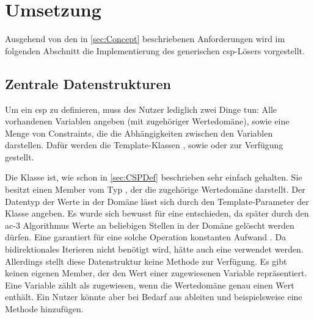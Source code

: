 \section{Umsetzung}
Ausgehend von den in \cref{sec:Concept} beschriebenen Anforderungen wird im folgenden Abschnitt die Implementierung des generischen \ac*{csp}-Lösers vorgestellt.

\subsection{Zentrale Datenstrukturen}
Um ein \ac*{csp} zu definieren, muss des Nutzer lediglich zwei Dinge tun: Alle vorhandenen Variablen angeben (mit zugehöriger Wertedomäne), sowie eine Menge von Constraints, die
die Abhängigkeiten zwischen den Variablen darstellen. Dafür werden die Template-Klassen , sowie  oder  zur
Verfügung gestellt.

Die Klasse  ist, wie schon in \cref{sec:CSPDef} beschrieben sehr einfach gehalten. Sie besitzt einen Member vom Typ , der die zugehörige
Wertedomäne darstellt. Der Datentyp der Werte in der Domäne lässt sich durch den Template-Parameter der Klasse angeben. Es wurde sich bewusst für eine 
entschieden, da später durch den \ac*{ac}-3 Algorithmus Werte an beliebigen Stellen in der Domäne gelöscht werden dürfen. Eine  garantiert für eine solche
Operation konstanten Aufwand \cite{stdList}. Da bidirektionales Iterieren nicht benötigt wird, hätte auch eine  verwendet werden. Allerdings stellt
diese Datenstruktur keine Methode  zur Verfügung. Es gibt keinen eigenen Member, der den Wert einer zugewiesenen Variable repräsentiert. Eine Variable zählt als
zugewiesen, wenn die Wertedomäne genau einen Wert enthält. Ein Nutzer könnte aber bei Bedarf aus  ableiten und beispielsweise eine Methode 
hinzufügen.